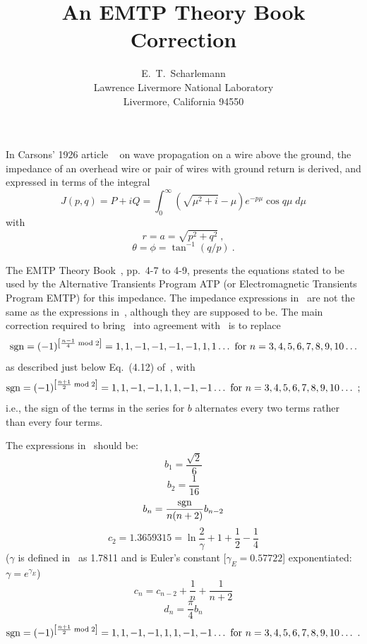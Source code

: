 \documentclass[12pt,fleqn]{article}
\title{
  An EMTP Theory Book Correction
}
\author{
  \vbox{\hsize=5.0in \baselineskip=12pt
    E.~T.~Scharlemann
  }
\\Lawrence Livermore National Laboratory
\\Livermore, California 94550
}
\begin{document}
%
%



\showllnl
\maketitle
\setcounter{page}{1}

In Carsons' 1926 article ~\cite{Carson} on wave propagation on a wire above the ground, the impedance of an overhead wire or pair of wires with ground return is derived, and expressed in terms of the integral
\[
   J(p, q) = P + i Q = \int_0^\infty \left( \sqrt{\mu^2 + i} - \mu \right) e^{-p\mu} \cos q\mu \; d\mu
\]
with
\[
   r = a = \sqrt{p^2 + q^2}  \ ,
\]
\[
   \theta = \phi = \tan^{-1}(q/p)  \ .
\]

The EMTP Theory Book~\cite{EMTP}, pp.~4-7  to 4-9, presents the equations stated to be used by the Alternative Transients Program ATP (or Electromagnetic Transients Program EMTP) for this impedance. The impedance expressions in~\cite{EMTP} are not the same as the expressions in~\cite{Carson}, although they are supposed to be. The main correction required to bring~\cite{EMTP} into agreement with~\cite{Carson} is to replace
\[
   \sgn = (-1)^{\left[\frac{n - 1}{4} \bmod 2\right]} = 1,1, -1, -1, -1, -1, 1, 1\ldots \text{   for   } n = 3, 4, 5, 6, 7, 8, 9, 10 \ldots
\]
as described just below Eq.~(4.12) of~\cite{EMTP}, with
\[
   \sgn = (-1)^{\left[\frac{n + 1}{2} \bmod 2\right]} = 1,1, -1, -1, 1, 1, -1, -1\ldots \text{   for   } n = 3, 4, 5, 6, 7, 8, 9, 10 \ldots  \ ;
\]
i.e., the sign of the terms in the series for $b$ alternates every two terms rather than every four terms.

The expressions in~\cite{EMTP} should be:
\[
   b_1 = \frac{\sqrt{2}}{6}
\]
\[
   b_2 = \frac{1}{16}
\]
\[
   b_n = \frac{\sgn}{n(n + 2)} b_{n - 2}
\]
\[
   c_2 = 1.3659315 = \ln \frac{2}{\gamma} + 1 + \frac{1}{2} - \frac{1}{4}
\]
($\gamma$ is defined in~\cite{Carson} as 1.7811 and is Euler's constant [$\gamma_E = 0.57722$] exponentiated: $\gamma = e^{\gamma_E}$)
\[
   c_n = c_{n-2} + \frac{1}{n} + \frac{1}{n + 2}
\]
\[
   d_n = \frac{\pi}{4} b_n
\]
\[
   \sgn = (-1)^{\left[\frac{n + 1}{2} \bmod 2\right]} = 1,1, -1, -1, 1, 1, -1, -1\ldots \text{   for   } n = 3, 4, 5, 6, 7, 8, 9, 10 \ldots \ .
\]
\end{document}
